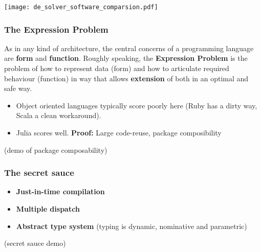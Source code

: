 \documentclass[t]{beamer}
\newcommand\df{\bf\color{Maroon}}
\begin{document}
\begin{frame}[plain]
     \texttt{[image: de\_solver\_software\_comparsion.pdf]}
\end{frame}

% 





\begin{frame}
  \frametitle{The Expression Problem}
  As in any kind of architecture, the central concerns of a
  programming language are {\df form} and {\df function}. Roughly
  speaking, the {\df Expression Problem} is the problem of how to
  represent data (form) and how to articulate required behaviour
  (function) in way that allows {\df extension} of both in an optimal
  and safe way.\pause
  \begin{itemize}
    \item Object oriented languages typically score poorly here (Ruby has a
      dirty way, Scala a clean workaround).
    \item Julia scores well. {\df Proof:} \pause Large code-reuse, package composibility
  \end{itemize}
\end{frame}


\begin{frame}
  (demo of package composability)
\end{frame}

\begin{frame}
  \frametitle{The secret sauce}
    \begin{itemize}
    \item {\df Just-in-time compilation}
    \item {\df Multiple dispatch}
    \item {\df Abstract type system} (typing is dynamic, nominative and parametric)
  \end{itemize}
\end{frame}

\begin{frame}
  (secret sauce demo)
\end{frame}
\end{document}
